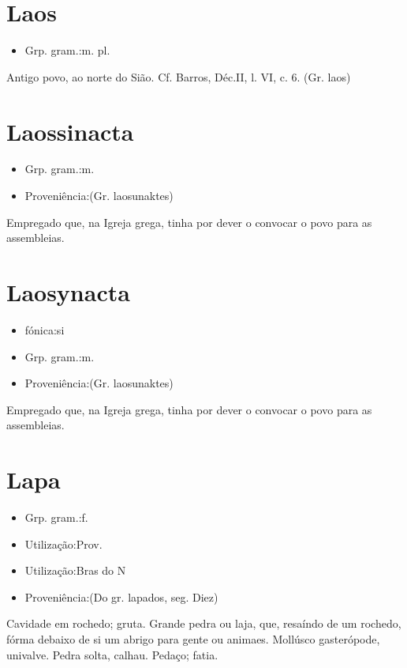 \section{Laos}
\begin{itemize}
\item {Grp. gram.:m. pl.}
\end{itemize}
Antigo povo, ao norte do Sião. Cf. Barros, \textunderscore Déc.\textunderscore  II, l. VI, c. 6. (Gr. \textunderscore laos\textunderscore )
\section{Laossinacta}
\begin{itemize}
\item {Grp. gram.:m.}
\end{itemize}
\begin{itemize}
\item {Proveniência:(Gr. \textunderscore laosunaktes\textunderscore )}
\end{itemize}
Empregado que, na Igreja grega, tinha por dever o convocar o povo para as assembleias.
\section{Laosynacta}
\begin{itemize}
\item {fónica:si}
\end{itemize}
\begin{itemize}
\item {Grp. gram.:m.}
\end{itemize}
\begin{itemize}
\item {Proveniência:(Gr. \textunderscore laosunaktes\textunderscore )}
\end{itemize}
Empregado que, na Igreja grega, tinha por dever o convocar o povo para as assembleias.
\section{Lapa}
\begin{itemize}
\item {Grp. gram.:f.}
\end{itemize}
\begin{itemize}
\item {Utilização:Prov.}
\end{itemize}
\begin{itemize}
\item {Utilização:Bras do N}
\end{itemize}
\begin{itemize}
\item {Proveniência:(Do gr. \textunderscore lapados\textunderscore , seg. Diez)}
\end{itemize}
Cavidade em rochedo; gruta.
Grande pedra ou laja, que, resaíndo de um rochedo, fórma debaixo de si um abrigo para gente ou animaes.
Mollúsco gasterópode, univalve.
Pedra solta, calhau.
Pedaço; fatia.
